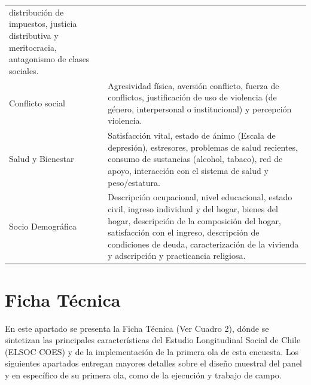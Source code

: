 \documentclass[
]{book}
\begin{document}
\begin{landscape}
\begin{table}
\begin{tabular}[t]{>{\raggedright\arraybackslash}p{2cm}>{\raggedright\arraybackslash}p{8cm}}
          distribución de impuestos, justicia distributiva y meritocracia, antagonismo
          de clases sociales.\\
Conflicto social & Agresividad física, aversión conflicto, fuerza de conflictos, justificación de
            uso de violencia (de género, interpersonal o institucional) y percepción
            violencia.\\
\addlinespace
Salud y Bienestar & Satisfacción vital, estado de ánimo (Escala de depresión), estresores, problemas
          de salud recientes, consumo de sustancias (alcohol, tabaco), red
          de apoyo, interacción con el sistema de salud y peso/estatura.\\
Socio Demográfica & Descripción ocupacional, nivel educacional, estado civil, ingreso individual
            y del hogar, bienes del hogar, descripción de la composición del hogar,
            satisfacción con el ingreso, descripción de condiciones de deuda, caracterización
            de la vivienda y adscripción y practicancia religiosa.\\
\bottomrule
\end{tabular}
\end{table}
\end{landscape}

\hypertarget{ficha-tuxe9cnica}{%
\section{Ficha Técnica}\label{ficha-tuxe9cnica}}

En este apartado se presenta la Ficha Técnica (Ver Cuadro 2), dónde se
sintetizan las principales características del Estudio Longitudinal
Social de Chile (ELSOC COES) y de la implementación de la primera ola de
esta encuesta. Los siguientes apartados entregan mayores detalles sobre
el diseño muestral del panel y en específico de su primera ola, como de
la ejecución y trabajo de campo.
\end{document}
